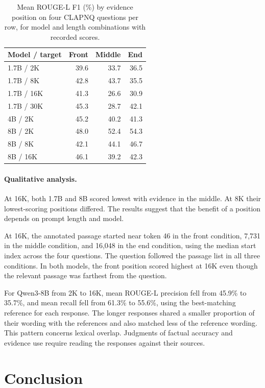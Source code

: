 \documentclass{article}
\begin{document}
\begin{table}[H]
\centering
\caption{Mean ROUGE-L F1 (\%) by evidence position on four CLAPNQ questions per row, for
model and length combinations with recorded scores.}
\small
\begin{tabular*}{\columnwidth}{@{\extracolsep{\fill}}lrrr@{}}
\toprule
\textbf{Model / target} & \textbf{Front} & \textbf{Middle} & \textbf{End} \\
\midrule
1.7B / 2K & 39.6 & 33.7 & 36.5 \\
1.7B / 8K & 42.8 & 43.7 & 35.5 \\
1.7B / 16K & 41.3 & 26.6 & 30.9 \\
1.7B / 30K & 45.3 & 28.7 & 42.1 \\
4B / 2K & 45.2 & 40.2 & 41.3 \\
8B / 2K & 48.0 & 52.4 & 54.3 \\
8B / 8K & 42.1 & 44.1 & 46.7 \\
8B / 16K & 46.1 & 39.2 & 42.3 \\
\bottomrule
\end{tabular*}
\end{table}

\paragraph{Qualitative analysis.}

At 16K, both 1.7B and 8B scored lowest with evidence in the middle. At 8K their lowest-scoring
positions differed. The results suggest that the benefit of a position depends on prompt
length and model.

At 16K, the annotated passage started near token 46 in the front condition, 7,731 in the
middle condition, and 16,048 in the end condition, using the median start index across the four
questions. The question followed the passage list in all three conditions. In both models,
the front position scored highest at 16K even though the relevant passage was farthest from
the question.

For Qwen3-8B from 2K to 16K, mean ROUGE-L precision fell from 45.9\% to 35.7\%, and mean
recall fell from 61.3\% to 55.6\%, using the best-matching reference for each response. The
longer responses shared a smaller proportion of their wording with the references and also
matched less of the reference wording. This pattern concerns lexical overlap. Judgments of
factual accuracy and evidence use require reading the responses against their sources.

\section{Conclusion}
\end{document}
